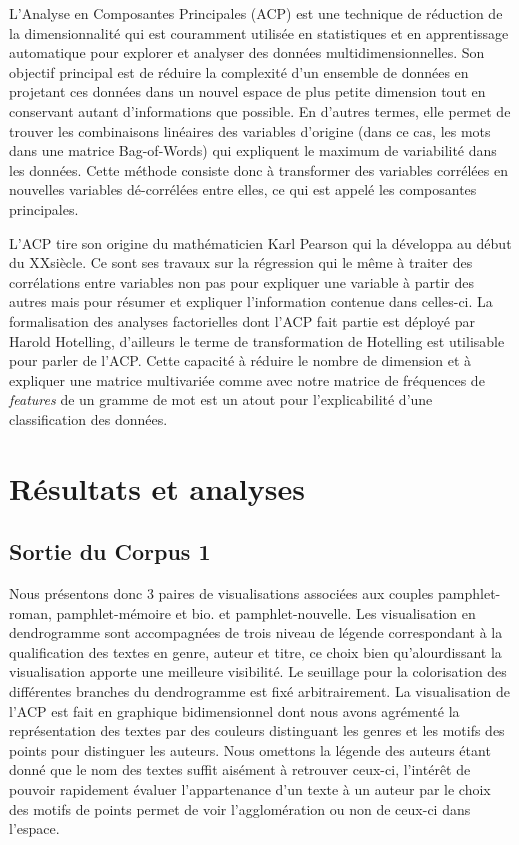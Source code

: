 L'Analyse en Composantes Principales (ACP) est une technique de réduction de la dimensionnalité qui est couramment utilisée en statistiques et en apprentissage automatique pour explorer et analyser des données multidimensionnelles. Son objectif principal est de réduire la complexité d'un ensemble de données en projetant ces données dans un nouvel espace de plus petite dimension tout en conservant autant d'informations que possible. En d'autres termes, elle permet de trouver les combinaisons linéaires des variables d'origine (dans ce cas, les mots dans une matrice Bag-of-Words) qui expliquent le maximum de variabilité dans les données. Cette méthode consiste donc à transformer des variables corrélées en nouvelles variables dé-corrélées entre elles, ce qui est appelé les composantes principales.\par
L'ACP tire son origine du mathématicien Karl Pearson qui la développa au début du XX\ieme siècle. Ce sont ses travaux sur la régression qui le même à traiter des corrélations entre variables non pas pour expliquer une variable à partir des autres mais pour résumer et expliquer l'information contenue dans celles-ci. La formalisation des analyses factorielles dont l'ACP fait partie est déployé par Harold Hotelling, d'ailleurs le terme de transformation de Hotelling est utilisable pour parler de l'ACP. 
Cette capacité à réduire le nombre de dimension et à expliquer une matrice multivariée comme avec notre matrice de fréquences de \textit{features} de un gramme de mot est un atout pour l'explicabilité d'une classification des données.


\section{Résultats et analyses}

\subsection{Sortie du Corpus 1}

Nous présentons donc 3 paires de visualisations associées aux couples pamphlet-roman, pamphlet-mémoire et bio. et pamphlet-nouvelle. Les visualisation en dendrogramme sont accompagnées de trois niveau de légende correspondant à la qualification des textes en genre, auteur et titre, ce choix bien qu'alourdissant la visualisation apporte une meilleure visibilité. Le seuillage pour la colorisation des différentes branches du dendrogramme est fixé arbitrairement. 
La visualisation de l'ACP est fait en graphique bidimensionnel dont nous avons agrémenté la représentation des textes par des couleurs distinguant les genres et les motifs des points pour distinguer les auteurs. Nous omettons la légende des auteurs étant donné que le nom des textes suffit aisément à retrouver ceux-ci, l'intérêt de pouvoir rapidement évaluer l'appartenance d'un texte à un auteur par le choix des motifs de points permet de voir l'agglomération ou non de ceux-ci dans l'espace.

